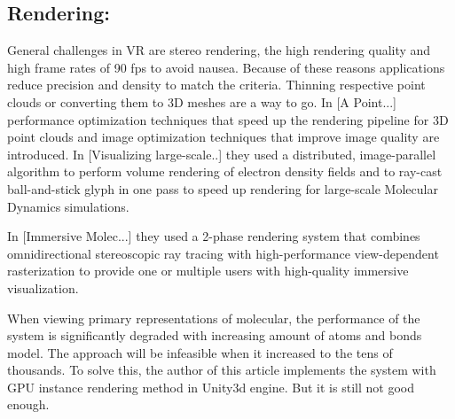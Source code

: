\documentclass[10pt,twocolumn,letterpaper]{article}
\begin{document}
\subsection{Rendering:}
General challenges in VR are stereo rendering, the high rendering quality and high frame rates of 90 fps to avoid nausea. Because of these reasons applications reduce precision and density to match the criteria. Thinning respective point clouds or converting them to 3D meshes are a way to go. In [A Point...] performance optimization techniques that speed up the rendering pipeline for 3D point clouds and image optimization techniques that improve image quality are introduced. In [Visualizing large-scale..] they used a distributed, image-parallel algorithm to perform volume rendering of electron density fields and to ray-cast ball-and-stick glyph in one pass to speed up rendering for large-scale Molecular Dynamics simulations.

 In [Immersive Molec...] they used a 2-phase rendering system that combines omnidirectional stereoscopic ray tracing with high-performance view-dependent rasterization to provide one or multiple users with high-quality immersive visualization. 

 When viewing primary representations of molecular, the performance of the system is significantly degraded with increasing amount of atoms and bonds model. The approach will be infeasible when it increased to the tens of thousands. To solve this, the author of this article \cite{Wiebrands2018} implements the system with GPU instance rendering method in Unity3d engine. But it is still not good enough. 



\end{document}
